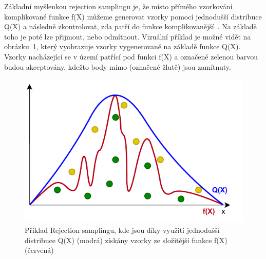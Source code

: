 Základní myšlenkou rejection samplingu je, že místo přímého vzorkování komplikované funkce f(X) můžeme generovat vzorky pomocí jednodušší distribuce Q(X) a následně zkontrolovat, zda patří do funkce komplikovanější~\cite{ghojogh2020sampling}. Na základě toho je poté lze přijmout, nebo odmítnout. Vizuální příklad je možné vidět na obrázku~\ref{fig:RA_graph}, který vyobrazuje vzorky vygenerované na základě funkce Q(X). Vzorky nacházející se v území patřící pod funkci f(X) a označené zelenou barvou budou akceptovány, kdežto body mimo (označené žlutě) jsou zamítnuty.

\vspace{0.3cm}
\begin{figure}[H]
    \centering
    \includegraphics[width=\textwidth]{obrazky-figures/ch2/RA_graph.pdf}
    \caption{Příklad Rejection samplingu, kde jsou díky využití jednodušší distribuce Q(X) (modrá) získány vzorky ze složitější funkce f(X) (červená)}
    \label{fig:RA_graph}
\end{figure}
\vspace{0.3cm}

